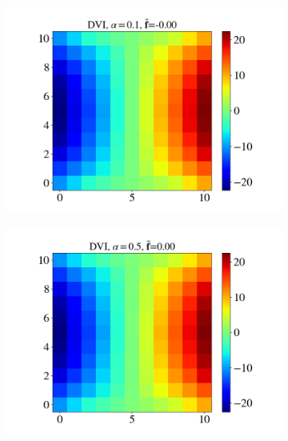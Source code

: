 \begin{itemize}
\begin{figure}[H]
\begin{subfigure}{0.32\columnwidth}
			\includegraphics[width=1.0\textwidth]{images/CD/Example7/10/T2_11_DVI_0.1.png}
		\end{subfigure}
		\begin{subfigure}{0.32\columnwidth}	
			\centering
			\includegraphics[width=1.0\textwidth]{images/CD/Example7/10/T2_11_DVI_0.5.png}
		\end{subfigure}
		\begin{subfigure}{0.32\columnwidth}	
			\centering

\end{subfigure}
\end{figure}
\end{itemize}
